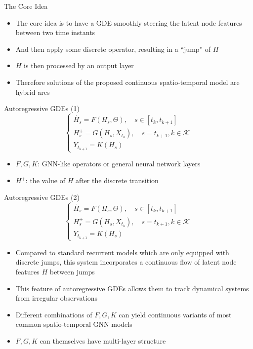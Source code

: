 \documentclass{beamer}
\begin{document}
\begin{frame}{The Core Idea}
\begin{itemize}
\item The core idea is to have a GDE smoothly steering the latent node features between two time instants
\item And then apply some discrete operator, resulting in a ``jump'' of $H$
\item $H$ is then processed by an output layer
\item Therefore solutions of the proposed continuous spatio-temporal model are hybrid arcs
\end{itemize}
\end{frame}


\begin{frame}{Autoregressive GDEs (1)}
\[
\begin{cases}
\dot{H_s}=F(H_s,\Theta),\quad s\in[t_k,t_{k+1}]\\
H_s^+=G(H_s,X_{t_k}),\quad s=t_{k+1},k\in\mathcal{K}\\
Y_{t_{k+1}}=K(H_s)
\end{cases}
\]
\begin{itemize}
\item $F,G,K$: GNN-like operators or general neural network layers
\item $H^+$: the value of $H$ after the discrete transition
\end{itemize}
\end{frame}

\begin{frame}{Autoregressive GDEs (2)}
\[
\begin{cases}
\dot{H_s}=F(H_s,\Theta),\quad s\in[t_k,t_{k+1}]\\
H_s^+=G(H_s,X_{t_k}),\quad s=t_{k+1},k\in\mathcal{K}\\
Y_{t_{k+1}}=K(H_s)
\end{cases}
\]
\begin{itemize}
\item Compared to standard recurrent models which are only equipped with discrete jumps, this system incorporates a continuous flow of latent node features $H$ between jumps
\item This feature of autoregressive GDEs allows them to track dynamical systems from irregular observations
\item Different combinations of $F,G,K$ can yield continuous variants of most common spatio-temporal GNN models
\item $F,G,K$ can themselves have multi-layer structure
\end{itemize}
\end{frame}
\end{document}
